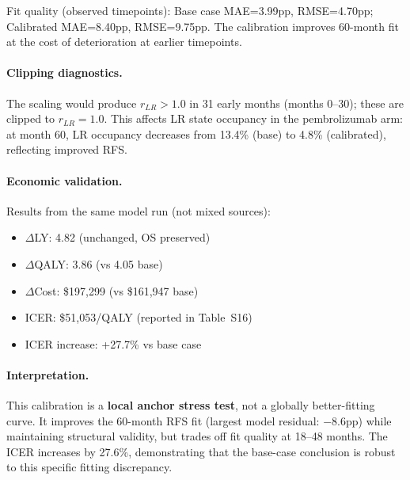Fit quality (observed timepoints): Base case MAE=3.99pp, RMSE=4.70pp; Calibrated MAE=8.40pp, RMSE=9.75pp. The calibration improves 60-month fit at the cost of deterioration at earlier timepoints.

\paragraph{Clipping diagnostics.} The scaling would produce $r_{LR}>1.0$ in 31 early months (months 0--30); these are clipped to $r_{LR}=1.0$. This affects LR state occupancy in the pembrolizumab arm: at month 60, LR occupancy decreases from 13.4\% (base) to 4.8\% (calibrated), reflecting improved RFS.

\paragraph{Economic validation.} Results from the same model run (not mixed sources):
\begin{itemize}
    \item $\Delta$LY: 4.82 (unchanged, OS preserved)
    \item $\Delta$QALY: 3.86 (vs 4.05 base)
    \item $\Delta$Cost: \$197,299 (vs \$161,947 base)
    \item ICER: \$51,053/QALY (reported in Table~S16)
    \item ICER increase: +27.7\% vs base case
\end{itemize}

\paragraph{Interpretation.} This calibration is a \textbf{local anchor stress test}, not a globally better-fitting curve. It improves the 60-month RFS fit (largest model residual: $-8.6$pp) while maintaining structural validity, but trades off fit quality at 18--48 months. The ICER increases by 27.6\%, demonstrating that the base-case conclusion is robust to this specific fitting discrepancy.
